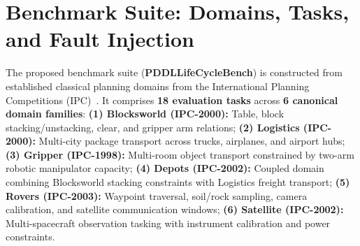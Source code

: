 \documentclass[10pt,a4paper]{article}
\begin{document}
\section{Benchmark Suite: Domains, Tasks, and Fault Injection}
The proposed benchmark suite (\textbf{PDDLLifeCycleBench}) is constructed from established classical planning domains from the International Planning Competitions (IPC)~\cite{mcdermott1998pddl,fox2003pddl21}. It comprises \textbf{18 evaluation tasks} across \textbf{6 canonical domain families}:
\textbf{(1) Blocksworld (IPC-2000):} Table, block stacking/unstacking, clear, and gripper arm relations;
\textbf{(2) Logistics (IPC-2000):} Multi-city package transport across trucks, airplanes, and airport hubs;
\textbf{(3) Gripper (IPC-1998):} Multi-room object transport constrained by two-arm robotic manipulator capacity;
\textbf{(4) Depots (IPC-2002):} Coupled domain combining Blocksworld stacking constraints with Logistics freight transport;
\textbf{(5) Rovers (IPC-2003):} Waypoint traversal, soil/rock sampling, camera calibration, and satellite communication windows;
\textbf{(6) Satellite (IPC-2002):} Multi-spacecraft observation tasking with instrument calibration and power constraints.
\end{document}
